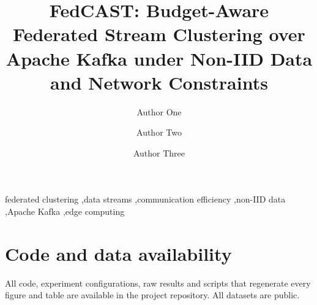 \documentclass[5p,times,authoryear=false]{elsarticle}
\begin{document}
\begin{frontmatter}

\title{FedCAST: Budget-Aware Federated Stream Clustering over Apache Kafka under Non-IID Data and Network Constraints}

\author[1]{Author One}
\author[1]{Author Two}
\author[1]{Author Three}



\begin{keyword}
federated clustering \sep data streams \sep communication efficiency \sep non-IID data \sep Apache Kafka \sep edge computing
\end{keyword}
\end{frontmatter}









\section*{Code and data availability}
All code, experiment configurations, raw results and scripts that regenerate every figure and table are available in the project repository. All datasets are public.





\end{document}
